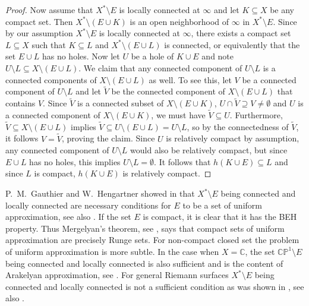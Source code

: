 \documentclass[a4paper,11pt]{amsart}
\newcommand{\C}{\mathbb C}
\begin{document}
\begin{proof}
    Now assume that $X^*\setminus E$ is locally connected at $\infty$ and let $K \subseteq X$ be any compact set. 
    Then $X^* \setminus (E \cup K)$ is an open neighborhood of $\infty$ in $X^*\setminus E$. 
    Since by our assumption $X^*\setminus E$ is locally connected at $\infty$, there exists a compact set $L \subseteq X$ such that $K \subseteq L$ and $X^* \setminus (E \cup L)$ is connected, or equivalently that the set $E \cup L$ has no holes. 
    Now let $U$ be a hole of $K \cup E$ and note $U \setminus L \subseteq X \setminus (E \cup L)$.
    We claim that any connected component of $U \setminus L$ is a connected components of $X \setminus (E \cup L)$ as well.
    To see this, let $V$ be a connected component of $U \setminus L$ and let $\widetilde{V}$ be the connected component of $X \setminus (E \cup L)$ that contains $V$.
    Since $\widetilde{V}$ is a connected subset of $X \setminus (E \cup K)$, $U \cap \widetilde{V} \supseteq V \neq \emptyset$ and $U$ is a connected component of $X \setminus (E \cup K)$, we must have $\widetilde{V} \subseteq U$.  
    Furthermore, $\widetilde{V} \subseteq X \setminus (E \cup L)$ implies $\widetilde{V} \subseteq U \setminus (E \cup L) = U \setminus L$, so by the connectedness of $\widetilde{V}$, it follows $V = \widetilde{V}$, proving the claim.
    Since $U$ is relatively compact by assumption, any connected component of $U \setminus L$ would also be relatively compact,
    but since $E \cup L$ has no holes, this implies $U \setminus L = \emptyset$.
    It follows that $h(K \cup E) \subseteq L$ and since $L$ is compact, $h(K \cup E)$ is relatively compact.
\end{proof}

P.~M.~Gauthier and W.~Hengartner showed in \cite{Gauthier_Hengartner} that $X^* \setminus E$ being connected and locally connected are necessary conditions for $E$ to be a set of uniform approximation, see also \cite{NeedConnectedAndLocConnected}.
If the set $E$ is compact, it is clear that it has the BEH property. 
Thus Mergelyan's theorem, see \cite[Theorem 3]{LegacyOfWeirstrass}, says that compact sets of uniform approximation are precisely Runge sets.
For non-compact closed set the problem of uniform approximation is more subtle. 
In the case when $X = \C$, the set $\mathbb{CP}^1 \setminus E$ being connected and locally connected is also sufficient and is the content of Arakelyan approximation, see \cite[Theorem 10]{LegacyOfWeirstrass}. 
For general Riemann surfaces $X^* \setminus E$ being connected and locally connected is not a sufficient condition as was shown in \cite{Gauthier_Hengartner}, see also \cite{NeedConnectedAndLocConnected}.
\end{document}
